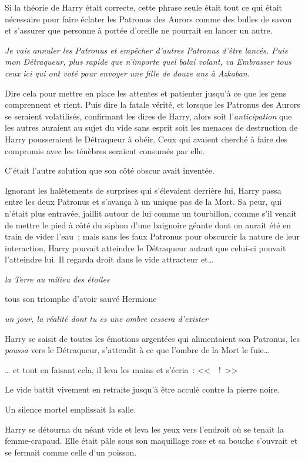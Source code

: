 Si la théorie de Harry était correcte, cette phrase seule était tout ce qui était nécessaire pour faire éclater les Patronus des Aurors comme des bulles de savon et s'assurer que personne à portée d'oreille ne pourrait en lancer un autre.

\emph{Je vais annuler les Patronus et empêcher d'autres Patronus d'être lancés. Puis mon Détraqueur, plus rapide que n'importe quel balai volant, va Embrasser tous ceux ici qui ont voté pour envoyer une fille de douze ans à Azkaban.}

Dire cela pour mettre en place les attentes et patienter jusqu'à ce que les gens comprennent et rient. Puis dire la fatale vérité, et lorsque les Patronus des Aurors se seraient volatilisés, confirmant les dires de Harry, alors soit l'\emph{anticipation} que les autres auraient au sujet du vide sans esprit soit les menaces de destruction de Harry pousseraient le Détraqueur à obéir. Ceux qui avaient cherché à faire des compromis avec les ténèbres seraient consumés par elle.

C'était l'autre solution que son côté obscur avait inventée.

Ignorant les halètements de surprises qui s'élevaient derrière lui, Harry passa entre les deux Patronus et s'avança à un unique pas de la Mort. Sa peur, qui n'était plus entravée, jaillit autour de lui comme un tourbillon, comme s'il venait de mettre le pied à côté du siphon d'une baignoire géante dont on aurait été en train de vider l'eau~; mais sans les faux Patronus pour obscurcir la nature de leur interaction, Harry pouvait atteindre le Détraqueur autant que celui-ci pouvait l'atteindre lui. Il regarda droit dans le vide attracteur et…

\emph{la Terre au milieu des étoiles}

tous son triomphe d'avoir sauvé Hermione

\emph{un jour, la réalité dont tu es une ombre cessera d'exister}

Harry se saisit de toutes les émotions argentées qui alimentaient son Patronus, les \emph{poussa} vers le Détraqueur, s'attendit à ce que l'ombre de la Mort le fuie…

… et tout en faisant cela, il leva les mains et s'écria~: <<~~!~>>

Le vide battit vivement en retraite jusqu'à être acculé contre la pierre noire.

Un silence mortel emplissait la salle.

Harry se détourna du néant vide et leva les yeux vers l'endroit où se tenait la femme-crapaud. Elle était pâle sous son maquillage rose et sa bouche s'ouvrait et se fermait comme celle d'un poisson.

